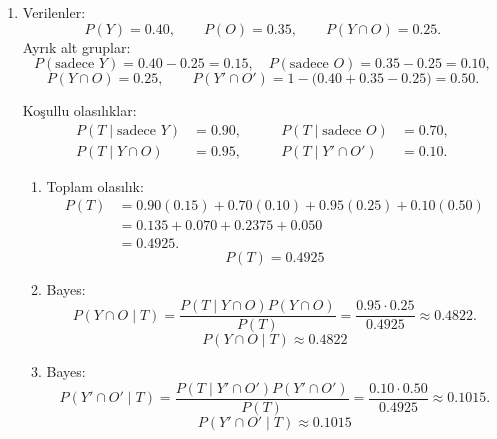\documentclass[12pt,a4paper]{article}
\begin{document}
\begin{enumerate}
\item Verilenler:
\[
P(Y)=0.40,\qquad P(O)=0.35,\qquad P(Y\cap O)=0.25.
\]
Ayrık alt gruplar:
\[
P(\text{sadece }Y)=0.40-0.25=0.15,\quad
P(\text{sadece }O)=0.35-0.25=0.10,
\]
\[
P(Y\cap O)=0.25,\qquad
P(Y'\cap O')=1-\bigl(0.40+0.35-0.25\bigr)=0.50.
\]
\begin{center}
\end{center}
Koşullu olasılıklar:
\begin{align*}
P(T\mid \text{sadece }Y)&=0.90,\qquad &P(T\mid \text{sadece }O)&=0.70,\\
P(T\mid Y\cap O)&=0.95,\qquad &P(T\mid Y'\cap O')&=0.10.
\end{align*}
\begin{enumerate}
\item Toplam olasılık:
\begin{align*}
P(T)&=0.90(0.15)+0.70(0.10)+0.95(0.25)+0.10(0.50)\\
&=0.135+0.070+0.2375+0.050\\
&=0.4925.
\end{align*}
\[
\boxed{P(T)=0.4925}
\]
\item Bayes:
\[
P(Y\cap O\mid T)=\frac{P(T\mid Y\cap O)P(Y\cap O)}{P(T)}
=\frac{0.95\cdot0.25}{0.4925}
\approx 0.4822.
\]
\[
\boxed{P(Y\cap O\mid T)\approx 0.4822}
\]
\item Bayes:
\[
P(Y'\cap O'\mid T)=\frac{P(T\mid Y'\cap O')P(Y'\cap O')}{P(T)}
=\frac{0.10\cdot0.50}{0.4925}
\approx 0.1015.
\]
\[
\boxed{P(Y'\cap O'\mid T)\approx 0.1015}
\]
\end{enumerate}
\end{enumerate}
\end{document}
